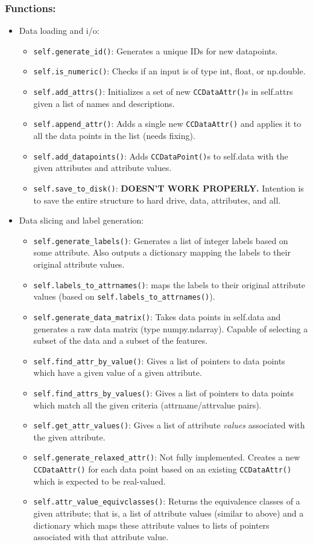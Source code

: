 \documentclass{article}
\newcommand{\ttt}{\texttt}
\begin{document}
\subsubsection{Functions:}
\begin{itemize}
\item Data loading and i/o:
\begin{itemize}
	\item \ttt{self.generate\_id()}: Generates a unique IDs for new datapoints.
	\item \ttt{self.is\_numeric()}: Checks if an input is of type int, float, or np.double.
	\item \ttt{self.add\_attrs()}: Initializes a set of new \ttt{CCDataAttr()}s in self.attrs given a list of names and descriptions.
	\item \ttt{self.append\_attr()}: Adds a single new \ttt{CCDataAttr()} and applies it to all the data points
	in the list (needs fixing).
	\item \ttt{self.add\_datapoints()}: Adds \ttt{CCDataPoint()}s to self.data with the given attributes and attribute values.
	\item \ttt{self.save\_to\_disk()}: \textbf{DOESN'T WORK PROPERLY.} Intention is to save the entire structure to hard drive,
			data, attributes, and all.
\end{itemize}
\item Data slicing and label generation:
\begin{itemize}
	\item \ttt{self.generate\_labels()}: Generates a list of integer labels based on some attribute. Also outputs a dictionary mapping the labels to their original attribute values.
	\item \ttt{self.labels\_to\_attrnames()}: maps the labels to their original attribute values (based on \ttt{self.labels\_to\_attrnames()}).
	\item \ttt{self.generate\_data\_matrix()}: Takes data points in self.data and generates a raw data matrix (type numpy.ndarray). Capable of
	selecting a subset of the data and a subset of the features.
	\item \ttt{self.find\_attr\_by\_value()}: Gives a list of pointers to data points which have a given value of a given attribute.
	\item \ttt{self.find\_attrs\_by\_values()}: Gives a list of pointers to data points which match all the given criteria (attrname/attrvalue pairs).
	\item \ttt{self.get\_attr\_values()}: Gives a list of attribute \emph{values} associated with the given attribute.
	\item \ttt{self.generate\_relaxed\_attr()}: Not fully implemented. Creates a new \ttt{CCDataAttr()} for each data point based on an existing \ttt{CCDataAttr()} which is expected to be real-valued.
	\item \ttt{self.attr\_value\_equivclasses()}: Returns the equivalence classes of a given attribute; that is, a list of attribute values (similar to above) and a dictionary which maps
			these attribute values to lists of pointers associated with that attribute value.
\end{itemize}


\end{itemize}
\end{document}
